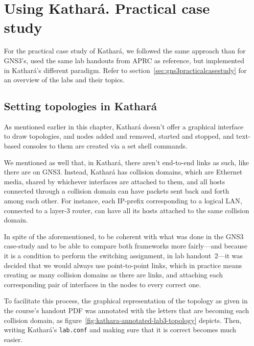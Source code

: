 \section{Using Kathará. Practical case study}
\label{sec:katharapracticalcasestudy}

For the practical case study of Kathará, we followed the same approach than for GNS3's, used the same lab handouts from APRC as reference, but implemented in Kathará's different paradigm.
Refer to section~\ref{sec:gns3practicalcasestudy} for an overview of the labs and their topics.

\subsection{Setting topologies in Kathará}

As mentioned earlier in this chapter, Kathará doesn't offer a graphical interface to draw topologies, and nodes added and removed, started and stopped, and text-based consoles to them are created via a set shell commands.

We mentioned as well that, in Kathará, there aren't end-to-end links as such, like there are on GNS3.
Instead, Kathará has collision domains, which are Ethernet media, shared by whichever interfaces are attached to them, and all hosts connected through a collision domain can have packets sent back and forth among each other.
For instance, each IP-prefix corresponding to a logical LAN, connected to a layer-3 router, can have all its hosts attached to the same collision domain.

In spite of the aforementioned, to be coherent with what was done in the GNS3 case-study and to be able to compare both frameworks more fairly---and because it is a condition to perform the switching assignment, in lab handout~2---it was decided that we would always use point-to-point links, which in practice means creating as many collision domains as there are links, and attaching each corresponding pair of interfaces in the nodes to every correct one. %



To facilitate this process, the graphical representation of the topology as given in the course's handout PDF was annotated with the letters that are becoming each collision domain, as figure~\ref{fig:kathara-annotated-lab3-topology} depicts. %
Then, writing Kathará's \texttt{lab.conf} and making sure that it is correct becomes much easier.

